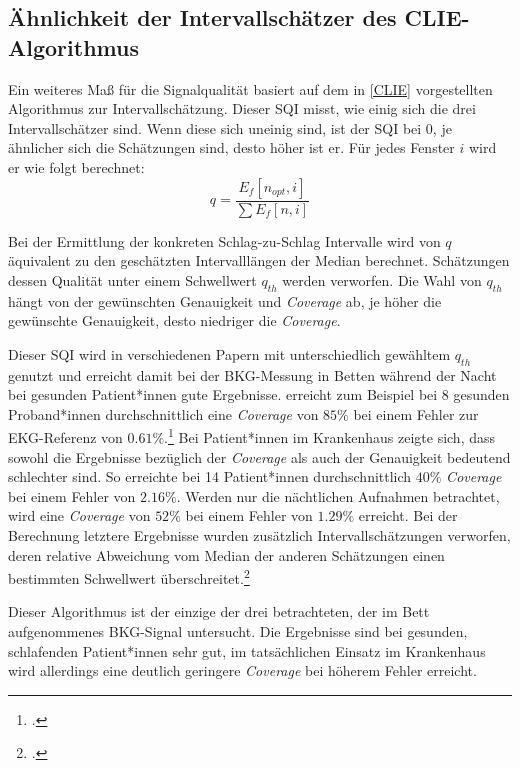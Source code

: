 	\subsection{Ähnlichkeit der Intervallschätzer des CLIE-Algorithmus}\label{brueserQI}
	
	Ein weiteres Maß für die Signalqualität basiert auf dem in \ref{CLIE} vorgestellten Algorithmus zur Intervallschätzung. Dieser \acl{SQI} misst, wie einig sich die drei Intervallschätzer sind. Wenn diese sich uneinig sind, ist der \ac{SQI} bei 0, je ähnlicher sich die Schätzungen sind, desto höher ist er. Für jedes Fenster $i$ wird er wie folgt berechnet: \[ q = \frac{E_f[n_{opt}, i]}{\sum E_f[n, i]} \]
	
	Bei der Ermittlung der konkreten Schlag-zu-Schlag Intervalle wird von $q$ äquivalent zu den geschätzten Intervalllängen der Median berechnet. Schätzungen dessen Qualität unter einem Schwellwert $q_{th}$ werden verworfen. Die Wahl von $q_{th}$ hängt von der gewünschten Genauigkeit und \textit{Coverage} ab, je höher die gewünschte Genauigkeit, desto niedriger die \textit{Coverage}.
	
	Dieser \ac{SQI} wird in verschiedenen Papern mit unterschiedlich gewähltem $q_{th}$ genutzt und erreicht damit bei der \ac{BKG}-Messung in Betten während der Nacht bei gesunden Patient*innen gute Ergebnisse. \citeauthor{Bruser2013} erreicht zum Beispiel bei 8 gesunden Proband*innen durchschnittlich eine \textit{Coverage} von $85 \%$ bei einem Fehler zur \ac{EKG}-Referenz von $0.61 \%$.\footcite[Vgl.][]{Bruser2013} Bei Patient*innen im Krankenhaus zeigte sich, dass sowohl die Ergebnisse bezüglich der \textit{Coverage} als auch der Genauigkeit bedeutend schlechter sind. So erreichte \citeauthor{HoogAntink2020} bei 14 Patient*innen durchschnittlich $40 \%$ \textit{Coverage} bei einem Fehler von $2.16 \%$. Werden nur die nächtlichen Aufnahmen betrachtet, wird eine \textit{Coverage} von $52 \%$ bei einem Fehler von $1.29 \%$ erreicht. Bei der Berechnung letztere Ergebnisse wurden zusätzlich Intervallschätzungen verworfen, deren relative Abweichung vom Median der anderen Schätzungen einen bestimmten Schwellwert überschreitet.\footcite[Vgl.][]{HoogAntink2020}
	
	Dieser Algorithmus ist der einzige der drei betrachteten, der im Bett aufgenommenes \ac{BKG}-Signal untersucht. Die Ergebnisse sind bei gesunden, schlafenden Patient*innen sehr gut, im tatsächlichen Einsatz im Krankenhaus wird allerdings eine deutlich geringere \textit{Coverage} bei höherem Fehler erreicht.
	
